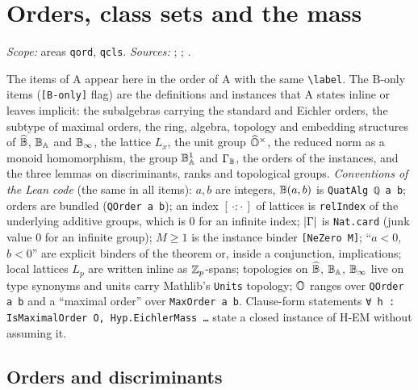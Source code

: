 \chapter{Orders, class sets and the mass}\label{ch:ch-iii-07-orders}

\noindent\emph{Scope:} areas \texttt{qord}, \texttt{qcls}. \emph{Sources:} \cite{Piz}; \cite{Shz}; \cite{Voi}.

\noindent The items of A appear here in the order of A with the same \texttt{\textbackslash label}. The B-only items (\texttt{[B-only]} flag) are the definitions and instances that
A states inline or leaves implicit: the subalgebras carrying the standard and Eichler orders, the subtype of maximal orders, the ring, algebra, topology and embedding
structures of $\widehat{\mathbb{B}}$, $\mathbb{B}_{\mathbb{A}}$ and $\mathbb{B}_{\infty}$, the lattice $L_x$, the unit group $\widehat{\mathbb{O}}^\times$, the reduced norm as a monoid homomorphism, the group $\mathbb{B}_{\mathbb{A}}^1$ and $\Gamma_{\mathbb{B}}$, the orders of the
instances, and the three lemmas on discriminants, ranks and topological groups. \emph{Conventions of the Lean code} (the same in all items): $a,b$ are integers, $\mathbb{B}(a,b)$ is \texttt{QuatAlg ℚ a b}; orders are bundled
(\texttt{QOrder a b}); an index $[\,\cdot:\cdot\,]$ of lattices is \texttt{relIndex} of the underlying additive groups, which is $0$ for an infinite index; $\lvert\Gamma\rvert$ is \texttt{Nat.card} (junk value $0$ for an infinite group);
$M\ge1$ is the instance binder \texttt{[NeZero M]}; ``$a<0$, $b<0$'' are explicit binders of the theorem or, inside a conjunction, implications; local lattices $L_p$ are written inline as $\mathbb{Z}_p$-spans;
topologies on $\widehat{\mathbb{B}}$, $\mathbb{B}_{\mathbb{A}}$, $\mathbb{B}_{\infty}$ live on type synonyms and units carry Mathlib's \texttt{Units} topology; $\mathbb{O}$ ranges over \texttt{QOrder a b} and a ``maximal order'' over \texttt{MaxOrder a b}.
Clause-form statements \texttt{∀ h : IsMaximalOrder O, Hyp.EichlerMass \dots} state a closed instance of H-EM without assuming it.

\section{Orders and discriminants}\label{sec:qord-orders}

